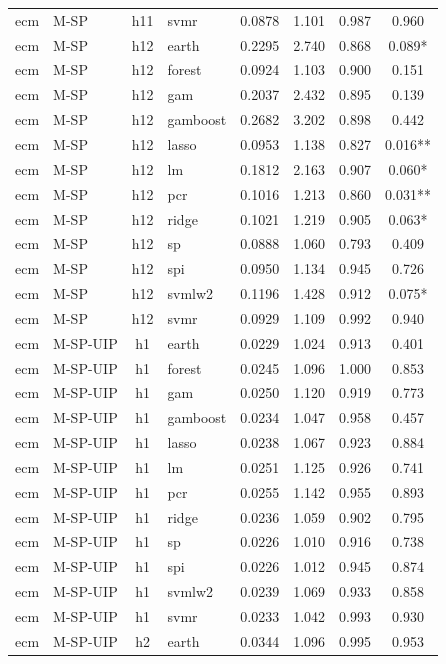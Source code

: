 \begin{ThreePartTable}
\begin{longtable}[t]{llclcccc}
ecm & M-SP & h11 & svmr & 0.0878 & 1.101 & 0.987 & 0.960\\
\addlinespace
ecm & M-SP & h12 & earth & 0.2295 & 2.740 & 0.868 & 0.089*\\
ecm & M-SP & h12 & forest & 0.0924 & 1.103 & 0.900 & 0.151\\
ecm & M-SP & h12 & gam & 0.2037 & 2.432 & 0.895 & 0.139\\
ecm & M-SP & h12 & gamboost & 0.2682 & 3.202 & 0.898 & 0.442\\
ecm & M-SP & h12 & lasso & 0.0953 & 1.138 & 0.827 & 0.016**\\
ecm & M-SP & h12 & lm & 0.1812 & 2.163 & 0.907 & 0.060*\\
ecm & M-SP & h12 & pcr & 0.1016 & 1.213 & 0.860 & 0.031**\\
ecm & M-SP & h12 & ridge & 0.1021 & 1.219 & 0.905 & 0.063*\\
ecm & M-SP & h12 & sp & 0.0888 & 1.060 & 0.793 & 0.409\\
ecm & M-SP & h12 & spi & 0.0950 & 1.134 & 0.945 & 0.726\\
ecm & M-SP & h12 & svmlw2 & 0.1196 & 1.428 & 0.912 & 0.075*\\
ecm & M-SP & h12 & svmr & 0.0929 & 1.109 & 0.992 & 0.940\\
\addlinespace
ecm & M-SP-UIP & h1 & earth & 0.0229 & 1.024 & 0.913 & 0.401\\
ecm & M-SP-UIP & h1 & forest & 0.0245 & 1.096 & 1.000 & 0.853\\
ecm & M-SP-UIP & h1 & gam & 0.0250 & 1.120 & 0.919 & 0.773\\
ecm & M-SP-UIP & h1 & gamboost & 0.0234 & 1.047 & 0.958 & 0.457\\
ecm & M-SP-UIP & h1 & lasso & 0.0238 & 1.067 & 0.923 & 0.884\\
ecm & M-SP-UIP & h1 & lm & 0.0251 & 1.125 & 0.926 & 0.741\\
ecm & M-SP-UIP & h1 & pcr & 0.0255 & 1.142 & 0.955 & 0.893\\
ecm & M-SP-UIP & h1 & ridge & 0.0236 & 1.059 & 0.902 & 0.795\\
ecm & M-SP-UIP & h1 & sp & 0.0226 & 1.010 & 0.916 & 0.738\\
ecm & M-SP-UIP & h1 & spi & 0.0226 & 1.012 & 0.945 & 0.874\\
ecm & M-SP-UIP & h1 & svmlw2 & 0.0239 & 1.069 & 0.933 & 0.858\\
ecm & M-SP-UIP & h1 & svmr & 0.0233 & 1.042 & 0.993 & 0.930\\
\addlinespace
ecm & M-SP-UIP & h2 & earth & 0.0344 & 1.096 & 0.995 & 0.953\\

\end{longtable}
\end{ThreePartTable}
